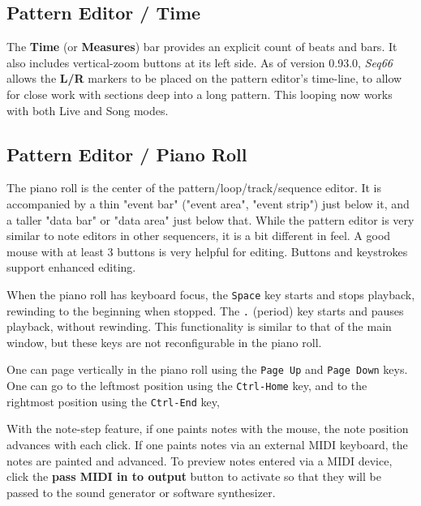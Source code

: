 \subsection{Pattern Editor / Time}
\label{subsec:pattern_editor_time}

   The \textbf{Time} (or \textbf{Measures}) bar provides an explicit count of
   beats and bars.  It also includes vertical-zoom buttons at its left side.
   As of version 0.93.0, \textsl{Seq66} allows the
   \textbf{L/R} markers to be placed on the pattern editor's time-line, to
   allow for close work with sections deep into a long pattern.
   This looping now works with both Live and Song modes.

\subsection{Pattern Editor / Piano Roll}
\label{subsec:pattern_editor_piano_roll}

   The piano roll is the center of the pattern/loop/track/sequence editor.
   It is accompanied by a thin "event bar" ("event area", "event strip")
   just below it,
   and a taller "data bar" or "data area" just below that.
   While the pattern
   editor is very similar to note editors in other sequencers, it is a bit
   different in feel.  A good mouse with at least 3 buttons is very helpful
   for editing.  Buttons and keystrokes support enhanced editing.

   When the piano roll has keyboard focus, the \texttt{Space} key
   starts and stops playback, rewinding to the beginning when stopped.
   The \texttt{.} (period) key starts and pauses playback, without
   rewinding.
   This functionality is similar to that of the main window, but
   these keys are not reconfigurable in the piano roll.

   One can page vertically in the piano roll using the
    \texttt{Page Up} and 
    \texttt{Page Down} keys.
   One can go to the leftmost position using the 
    \texttt{Ctrl-Home} key,
   and to the rightmost position using the
    \texttt{Ctrl-End} key,

   With the note-step feature, if one paints notes with the mouse,
   the note position advances with each click.
   If one paints notes via an external MIDI keyboard, the notes are painted and
   advanced.
   To preview notes entered via a MIDI device, click the
   \textbf{pass MIDI in to output} button to activate so that they will be
   passed to the sound generator or software synthesizer.

